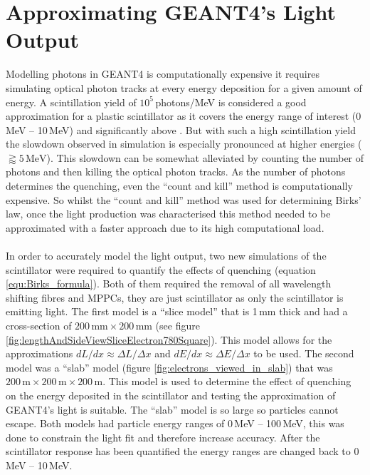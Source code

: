 \section{Approximating GEANT4's Light Output}\label{sec:GEANT4Simulation_MonteCarloBirksLaw}
Modelling photons in GEANT4 is computationally expensive it requires simulating optical photon tracks at every energy deposition for a given amount of energy. A scintillation yield of $10^5$\,photons/MeV is considered a good approximation for a plastic scintillator as it covers the energy range of interest (0\,MeV -- 10\,MeV) and significantly above \cite{craun_1970}. But with such a high scintillation yield the slowdown observed in simulation is especially pronounced at higher energies ($\gtrapprox 5\,\textrm{MeV}$). This slowdown can be somewhat alleviated by counting the number of photons and then killing the optical photon tracks. As the number of photons determines the quenching, even the ``count and kill'' method is computationally expensive. So whilst the ``count and kill'' method was used for determining Birks' law, once the light production was characterised this method needed to be approximated with a faster approach due to its high computational load.
\\\\In order to accurately model the light output, two new simulations of the scintillator were required to quantify the effects of quenching (equation \ref{equ:Birks_formula}). Both of them required the removal of all wavelength shifting fibres and MPPCs, they are just scintillator as only the scintillator is emitting light. The first model is a ``slice model'' that is 1\,mm thick and had a cross-section of $200\,\textrm{mm} \times 200\,\textrm{mm}$ (see figure \ref{fig:lengthAndSideViewSliceElectron780Square}). This model allows for the approximations $dL/dx \approx \Delta L / \Delta x$ and $dE/dx \approx \Delta E / \Delta x$ to be used. The second model was a ``slab'' model (figure \ref{fig:electrons_viewed_in_slab}) that was $200\,\textrm{m} \times 200\,\textrm{m} \times 200\,\textrm{m}$. This model is used to determine the effect of quenching on the energy deposited in the scintillator and testing the approximation of GEANT4's light is suitable. The ``slab'' model is so large so particles cannot escape. Both models had particle energy ranges of 0\,MeV -- 100\,MeV, this was done to constrain the light fit and therefore increase accuracy. After the scintillator response has been quantified the energy ranges are changed back to 0\,MeV -- 10\,MeV. %

